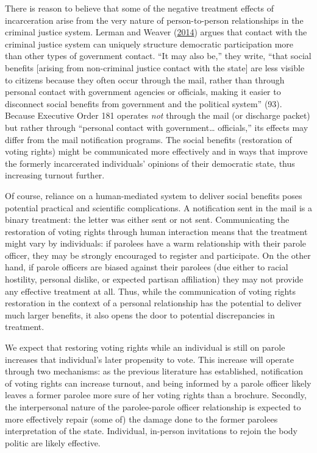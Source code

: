 \documentclass[
  12pt,
]{article}
\begin{document}
There is reason to believe that some of the negative treatment effects of incarceration arise from the very nature of person-to-person relationships in the criminal justice system. Lerman and Weaver (\protect\hyperlink{ref-Lerman2014}{2014}) argues that contact with the criminal justice system can uniquely structure democratic participation more than other types of government contact. ``It may also be,'' they write, ``that social benefits {[}arising from non-criminal justice contact with the state{]} are less visible to citizens because they often occur through the mail, rather than through personal contact with government agencies or officials, making it easier to disconnect social benefits from government and the political system'' (93). Because Executive Order 181 operates \emph{not} through the mail (or discharge packet) but rather through ``personal contact with government\ldots{} officials,'' its effects may differ from the mail notification programs. The social benefits (restoration of voting rights) might be communicated more effectively and in ways that improve the formerly incarcerated individuals' opinions of their democratic state, thus increasing turnout further.

Of course, reliance on a human-mediated system to deliver social benefits poses potential practical and scientific complications. A notification sent in the mail is a binary treatment: the letter was either sent or not sent. Communicating the restoration of voting rights through human interaction means that the treatment might vary by individuals: if parolees have a warm relationship with their parole officer, they may be strongly encouraged to register and participate. On the other hand, if parole officers are biased against their parolees (due either to racial hostility, personal dislike, or expected partisan affiliation) they may not provide any effective treatment at all. Thus, while the communication of voting rights restoration in the context of a personal relationship has the potential to deliver much larger benefits, it also opens the door to potential discrepancies in treatment.

We expect that restoring voting rights while an individual is still on parole increases that individual's later propensity to vote. This increase will operate through two mechanisms: as the previous literature has established, notification of voting rights can increase turnout, and being informed by a parole officer likely leaves a former parolee more sure of her voting rights than a brochure. Secondly, the interpersonal nature of the parolee-parole officer relationship is expected to more effectively repair (some of) the damage done to the former parolees interpretation of the state. Individual, in-person invitations to rejoin the body politic are likely effective.
\end{document}
